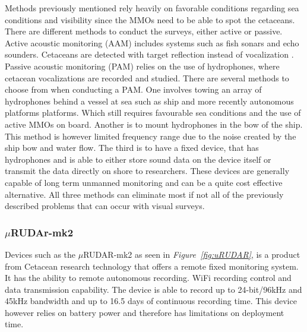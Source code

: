 Methods previously mentioned rely heavily on favorable conditions regarding sea conditions and visibility since the MMOs need to be able to spot the cetaceans.
There are different methods to conduct the surveys, either active or passive.
Active acoustic monitoring (AAM) includes systems such as fish sonars and echo sounders. 
Cetaceans are detected with target reflection instead of vocalization \cite{pyc_evaluation_2015}.
Passive acoustic monitoring (PAM) relies on the use of hydrophones, where cetacean vocalizations are recorded and studied.
There are several methods to choose from when conducting a PAM.
One involves towing an array of hydrophones behind a vessel at sea such as ship and more recently autonomous platforms platforms\cite{baumgartner_diel_2008}.
Which still requires favourable sea conditions and the use of active MMOs on board.
Another is to mount hydrophones in the bow of the ship.
This method is however limited frequency range due to the noise created by the ship bow and water flow\cite{rankin_acoustic_2008}.
The third is to have a fixed device, that has hydrophones and is able to either store sound data on the device itself or transmit the data directly on shore to researchers.
These devices are generally capable of long term unmanned monitoring and can be a quite cost effective alternative.
All three methods can eliminate most if not all of the previously described problems that can occur with visual surveys.



\subsubsection{$\mu$RUDAr-mk2}

Devices such as the $\mu$RUDAR-mk2 as seen in \textit{Figure~\ref{fig:uRUDAR}}, is a product from Cetacean research technology that offers a remote fixed monitoring system.
It has the ability to remote autonomous recording.
WiFi recording control and data transmission capability.
The device is able to record up to 24-bit/96kHz and 45kHz bandwidth and up to 16.5 days of continuous recording time\cite{computing_microrudar_nodate}.
This device however relies on battery power and therefore has limitations on deployment time.

